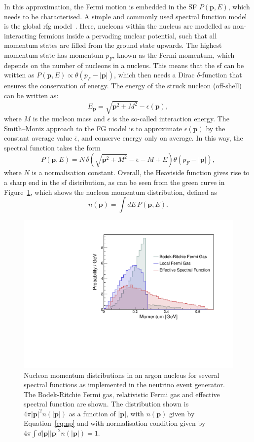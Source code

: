 In this approximation, the Fermi motion is embedded in the SF $P (\mathbf{p}, E)$, which needs to be characterised.
A simple and commonly used spectral function model is the global \acrfull{rfg} model~\cite{moniz}. Here, nucleons within the nucleus are modelled as non-interacting fermions inside a pervading nuclear potential, such that all momentum states are filled from the ground state upwards. The highest momentum state has momentum $p_F$, known as the Fermi momentum, which depends on the number of nucleons in a nucleus. 
This means that the \acrshort{sf} can be written as $P(\mathbf{p}, E) \propto \theta(p_F - |\mathbf{p}|)$, which then needs a Dirac $\delta$-function that ensures the conservation of energy. The energy of the struck nucleon (off-shell) can be written as:
\begin{equation}
E_\mathbf{p} = \sqrt{\mathbf{p}^2 + M^2} - \epsilon(\mathbf{p}),
\end{equation}
where $M$ is the nucleon mass and $\epsilon$ is the so-called interaction energy. The Smith–Moniz approach to the FG model \cite{moniz} is to approximate $\epsilon(\mathbf{p})$ by the constant average value $\bar{\epsilon}$, and conserve energy only on average. In this way, the spectral function takes the form
\begin{equation}
P(\mathbf{p}, E) = N \, \delta(\sqrt{\mathbf{p}^2 + M^2} - \bar{\epsilon} - M + E)\theta(p_F - |\mathbf{p}|),
\end{equation}
where $N$ is a normalisation constant. Overall, the Heaviside function gives rise to a sharp end in the \acrshort{sf} distribution, as can be seen from the green curve in Figure~\ref{fig:nucleon_momentum}, which shows the nucleon momentum distribution, defined as
\begin{equation}
\label{eq:np}
n(\mathbf{p}) = \int dE \, P(\mathbf{p}, E).
\end{equation}

\begin{figure}[]
\centering
\includegraphics[width=.70\textwidth]{images/NeutrinoInteractions/nucleon_momentum}
\caption[Fermi Motion Distributions]{Nucleon momentum distributions in an argon nucleus for several spectral functions as implemented in the \g neutrino event generator. The Bodek-Ritchie Fermi gas, relativistic Fermi gas and effective spectral function are shown. The distribution shown is $4\pi |\bm{p}|^2n(|\bm{p}|)$ as a function of $|\bm{p}|$, with $n(\bm{p})$ given by Equation~\eqref{eq:np} and with normalisation condition given by $ 4\pi \int d|\bm{p}||\bm{p}|^2n(|\bm{p}|) = 1$.}
\label{fig:nucleon_momentum}
\end{figure}

